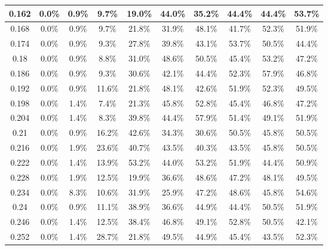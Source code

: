 \begin{table}[H]
\begin{tabular}{|c|c|c|c|c|c|c|c|c|c|}
\hline
0.162 &\cellcolor{green!25}0.0\% &\cellcolor{green!25}0.9\% & 9.7\% & 19.0\% & 44.0\% & 35.2\% & 44.4\% & 44.4\% & 53.7\% \\
\hline
0.168 &\cellcolor{green!25}0.0\% &\cellcolor{green!25}0.9\% & 9.7\% & 21.8\% & 31.9\% & 48.1\% & 41.7\% & 52.3\% & 51.9\% \\
\hline
0.174 &\cellcolor{green!25}0.0\% &\cellcolor{green!25}0.9\% & 9.3\% & 27.8\% & 39.8\% & 43.1\% & 53.7\% & 50.5\% & 44.4\% \\
\hline
0.18 &\cellcolor{green!25}0.0\% &\cellcolor{green!25}0.9\% & 8.8\% & 31.0\% & 48.6\% & 50.5\% & 45.4\% & 53.2\% & 47.2\% \\
\hline
0.186 &\cellcolor{green!25}0.0\% &\cellcolor{green!25}0.9\% & 9.3\% & 30.6\% & 42.1\% & 44.4\% & 52.3\% & 57.9\% & 46.8\% \\
\hline
0.192 &\cellcolor{green!25}0.0\% &\cellcolor{green!25}0.9\% & 11.6\% & 21.8\% & 48.1\% & 42.6\% & 51.9\% & 52.3\% & 49.5\% \\
\hline
0.198 &\cellcolor{green!25}0.0\% & 1.4\% & \cellcolor{green!25}7.4\% & 21.3\% & 45.8\% & 52.8\% & 45.4\% & 46.8\% & 47.2\% \\
\hline
0.204 &\cellcolor{green!25}0.0\% & 1.4\% & 8.3\% & 39.8\% & 44.4\% & 57.9\% & 51.4\% & 49.1\% & 51.9\% \\
\hline
0.21 &\cellcolor{green!25}0.0\% &\cellcolor{green!25}0.9\% & 16.2\% & 42.6\% & 34.3\% & 30.6\% & 50.5\% & 45.8\% & 50.5\% \\
\hline
0.216 &\cellcolor{green!25}0.0\% & 1.9\% & 23.6\% & 40.7\% & 43.5\% & 40.3\% & 43.5\% & 45.8\% & 50.5\% \\
\hline
0.222 &\cellcolor{green!25}0.0\% & 1.4\% & 13.9\% & 53.2\% & 44.0\% & 53.2\% & 51.9\% & 44.4\% & 50.9\% \\
\hline
0.228 &\cellcolor{green!25}0.0\% & 1.9\% & 12.5\% & 19.9\% & 36.6\% & 48.6\% & 47.2\% & 48.1\% & 49.5\% \\
\hline
0.234 &\cellcolor{green!25}0.0\% & 8.3\% & 10.6\% & 31.9\% & 25.9\% & 47.2\% & 48.6\% & 45.8\% & 54.6\% \\
\hline
0.24 &\cellcolor{green!25}0.0\% &\cellcolor{green!25}0.9\% & 11.1\% & 38.9\% & 36.6\% & 44.9\% & 44.4\% & 50.5\% & 51.9\% \\
\hline
0.246 &\cellcolor{green!25}0.0\% & 1.4\% & 12.5\% & 38.4\% & 46.8\% & 49.1\% & 52.8\% & 50.5\% & 42.1\% \\
\hline
0.252 &\cellcolor{green!25}0.0\% & 1.4\% & 28.7\% & 21.8\% & 49.5\% & 44.9\% & 45.4\% & 43.5\% & 52.3\%\\
\hline
\end{tabular}
\end{table}

